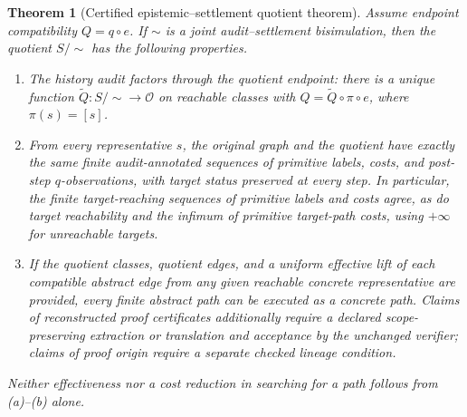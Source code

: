\documentclass[11pt,letterpaper]{article}
\newtheorem{theorem}{Theorem}[section]
\theoremstyle{definition}
\newcommand{\Obs}{\mathcal O}
\begin{document}
\begin{theorem}[Certified epistemic--settlement quotient theorem]\label{thm:joint}
Assume endpoint compatibility $Q=q\circ e$. If $\sim$ is a joint audit--settlement bisimulation, then the quotient $S/{\sim}$ has the following properties.
\begin{enumerate}[label=(\alph*)]
\item The history audit factors through the quotient endpoint: there is a unique function $\widetilde Q:S/{\sim}\to\Obs$ on reachable classes with $Q=\widetilde Q\circ\pi\circ e$, where $\pi(s)=[s]$.
\item From every representative $s$, the original graph and the quotient have exactly the same finite \emph{audit-annotated} sequences of primitive labels, costs, and post-step $q$-observations, with target status preserved at every step. In particular, the finite target-reaching sequences of primitive labels and costs agree, as do target reachability and the infimum of primitive target-path costs, using $+\infty$ for unreachable targets.
\item If the quotient classes, quotient edges, and a \emph{uniform effective lift} of each compatible abstract edge from any given reachable concrete representative are provided, every finite abstract path can be executed as a concrete path. Claims of reconstructed proof certificates additionally require a declared scope-preserving extraction or translation and acceptance by the unchanged verifier; claims of proof \emph{origin} require a separate checked lineage condition.
\end{enumerate}
Neither effectiveness nor a cost reduction in searching for a path follows from (a)--(b) alone.
\end{theorem}
\end{document}
